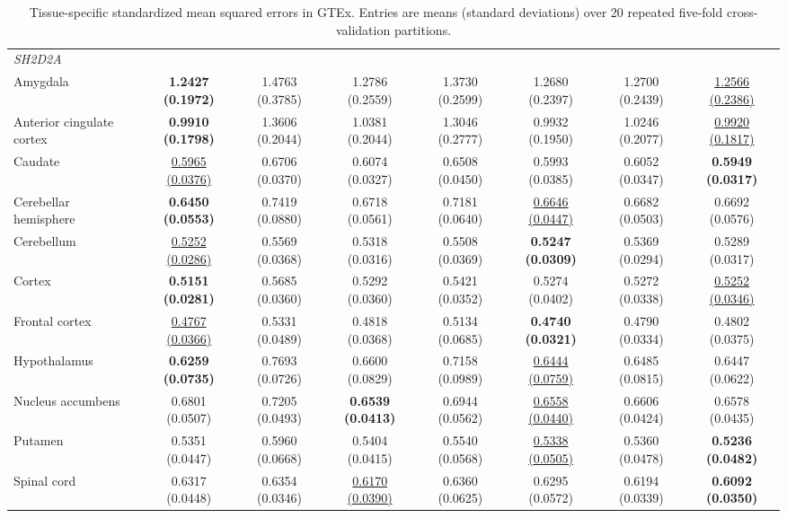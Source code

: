 \begin{table}
\begin{tabular}{lccccccc}
\midrule
\multicolumn{8}{l}{\textit{SH2D2A}} \\
Amygdala & \textbf{1.2427 (0.1972)} & 1.4763 (0.3785) & 1.2786 (0.2559) & 1.3730 (0.2599) & 1.2680 (0.2397) & 1.2700 (0.2439) & \underline{1.2566 (0.2386)} \\
Anterior cingulate cortex & \textbf{0.9910 (0.1798)} & 1.3606 (0.2044) & 1.0381 (0.2044) & 1.3046 (0.2777) & 0.9932 (0.1950) & 1.0246 (0.2077) & \underline{0.9920 (0.1817)} \\
Caudate & \underline{0.5965 (0.0376)} & 0.6706 (0.0370) & 0.6074 (0.0327) & 0.6508 (0.0450) & 0.5993 (0.0385) & 0.6052 (0.0347) & \textbf{0.5949 (0.0317)} \\
Cerebellar hemisphere & \textbf{0.6450 (0.0553)} & 0.7419 (0.0880) & 0.6718 (0.0561) & 0.7181 (0.0640) & \underline{0.6646 (0.0447)} & 0.6682 (0.0503) & 0.6692 (0.0576) \\
Cerebellum & \underline{0.5252 (0.0286)} & 0.5569 (0.0368) & 0.5318 (0.0316) & 0.5508 (0.0369) & \textbf{0.5247 (0.0309)} & 0.5369 (0.0294) & 0.5289 (0.0317) \\
Cortex & \textbf{0.5151 (0.0281)} & 0.5685 (0.0360) & 0.5292 (0.0360) & 0.5421 (0.0352) & 0.5274 (0.0402) & 0.5272 (0.0338) & \underline{0.5252 (0.0346)} \\
Frontal cortex & \underline{0.4767 (0.0366)} & 0.5331 (0.0489) & 0.4818 (0.0368) & 0.5134 (0.0685) & \textbf{0.4740 (0.0321)} & 0.4790 (0.0334) & 0.4802 (0.0375) \\
Hypothalamus & \textbf{0.6259 (0.0735)} & 0.7693 (0.0726) & 0.6600 (0.0829) & 0.7158 (0.0989) & \underline{0.6444 (0.0759)} & 0.6485 (0.0815) & 0.6447 (0.0622) \\
Nucleus accumbens & 0.6801 (0.0507) & 0.7205 (0.0493) & \textbf{0.6539 (0.0413)} & 0.6944 (0.0562) & \underline{0.6558 (0.0440)} & 0.6606 (0.0424) & 0.6578 (0.0435) \\
Putamen & 0.5351 (0.0447) & 0.5960 (0.0668) & 0.5404 (0.0415) & 0.5540 (0.0568) & \underline{0.5338 (0.0505)} & 0.5360 (0.0478) & \textbf{0.5236 (0.0482)} \\
Spinal cord & 0.6317 (0.0448) & 0.6354 (0.0346) & \underline{0.6170 (0.0390)} & 0.6360 (0.0625) & 0.6295 (0.0572) & 0.6194 (0.0339) & \textbf{0.6092 (0.0350)} \\
\bottomrule
\end{tabular}
\caption{Tissue-specific standardized mean squared errors in GTEx. Entries are means (standard deviations) over 20 repeated five-fold cross-validation partitions.}
\label{tab:gtex-tissue}
\end{table}
